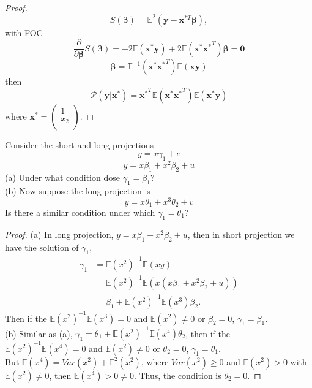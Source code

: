 \documentclass[12pt]{article}
\newenvironment{question}[2][Question]{\begin{trivlist}
\item[\hskip \labelsep {\bfseries #1}\hskip \labelsep {\bfseries #2.}]}{\end{trivlist}}
\begin{document}
\begin{proof}
$$S(\boldsymbol{\beta}) = \mathbb{E}^2(\mathbf{y}-\mathbf{x}^{*T}\boldsymbol{\beta}),$$with FOC
$$\frac{\partial}{\partial\boldsymbol{\beta}}S(\boldsymbol{\beta}) = -2\mathbb{E}(\mathbf{x^*y})+2\mathbb{E}(\mathbf{x^*x^*}^T)\boldsymbol{\beta} = \mathbf{0}$$
$$\boldsymbol{\beta} = \mathbb{E}^{-1}(\mathbf{x^*x^*}^T)\mathbb{E}(\mathbf{xy})$$
then
$$\mathcal{P}(\mathbf{y|x^*}) = \mathbf{x^*}^T\mathbb{E}(\mathbf{x^*x^*}^T)\mathbb{E}(\mathbf{x^*y})$$
where $\mathbf{x^*} = \begin{pmatrix}
1\\
x_2\\
\end{pmatrix}$.
\end{proof}

\begin{question}{2.21}
Consider the short and long projections
$$y = x\gamma_1+e$$
$$y = x\beta_1+x^2\beta_2+u$$
(a) Under what condition dose $\gamma_1 = \beta_1$?\\
(b) Now suppose the long projection is 
$$y = x\theta_1+x^3\theta_2+v$$
Is there a similar condition under which $\gamma_1 = \theta_1$?
\end{question}

\begin{proof}
(a) In long projection, $y = x\beta_1+x^2\beta_2+u$, then in short projection we have the solution of $\gamma_1$,
\begin{align*}
\gamma_1 &= \mathbb{E}(x^2)^{-1}\mathbb{E}(x y)\\
&=\mathbb{E}(x^2)^{-1}\mathbb{E}(x(x\beta_1+x^2\beta_2+u))\\
&=\beta_1+\mathbb{E}(x^2)^{-1}\mathbb{E}(x^3)\beta_2.
\end{align*}
Then if the $\mathbb{E}(x^2)^{-1}\mathbb{E}(x^3) = 0$ and $\mathbb{E}(x^2)\ne 0$ or $\beta_2 = 0$, $\gamma_1 = \beta_1$.\\
(b) Similar as (a), $\gamma_1  =\theta_1+\mathbb{E}(x^2)^{-1}\mathbb{E}(x^4)\theta_2$, then if the $\mathbb{E}(x^2)^{-1}\mathbb{E}(x^4) = 0$ and $\mathbb{E}(x^2)\ne 0$ or $\theta_2 = 0$, $\gamma_1 = \theta_1$.\\
But $\mathbb{E}(x^4) = Var(x^2)+\mathbb{E}^2(x^2)$, where $Var(x^2)\ge 0$ and $\mathbb{E}(x^2)>0$ with $\mathbb{E}(x^2)\ne 0$, then $\mathbb{E}(x^4)>0\ne0$.
Thus, the condition is $\theta_2 = 0$.
\end{proof}
\end{document}
